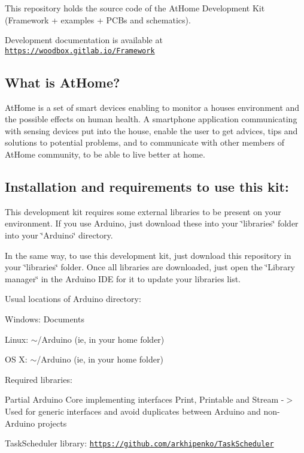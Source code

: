 This repository holds the source code of the At\+Home Development Kit (Framework + examples + P\+C\+Bs and schematics).

Development documentation is available at \href{https://woodbox.gitlab.io/Framework}{\tt https\+://woodbox.\+gitlab.\+io/\+Framework}

\subsection*{What is At\+Home?}

At\+Home is a set of smart devices enabling to monitor a house\textquotesingle{}s environment and the possible effects on human health. A smartphone application communicating with sensing devices put into the house, enable the user to get advices, tips and solutions to potential problems, and to communicate with other members of At\+Home community, to be able to live better at home.

\subsection*{Installation and requirements to use this kit\+:}

This development kit requires some external libraries to be present on your environment. If you use Arduino, just download these into your \char`\"{}libraries\char`\"{} folder into your \char`\"{}\+Arduino\char`\"{} directory.

In the same way, to use this development kit, just download this repository in your \char`\"{}libraries\char`\"{} folder. Once all libraries are downloaded, just open the \char`\"{}\+Library manager\char`\"{} in the Arduino I\+DE for it to update your libraries list.

Usual locations of Arduino directory\+:
\begin{DoxyItemize}
\item Windows\+: Documents
\item Linux\+: $\sim$/\+Arduino (ie, in your home folder)
\item OS X\+: $\sim$/\+Arduino (ie, in your home folder)
\end{DoxyItemize}

Required libraries\+:
\begin{DoxyItemize}
\item Partial Arduino Core implementing interfaces Print, Printable and Stream -\/$>$ Used for generic interfaces and avoid duplicates between Arduino and non-\/\+Arduino projects
\item Task\+Scheduler library\+: \href{https://github.com/arkhipenko/TaskScheduler}{\tt https\+://github.\+com/arkhipenko/\+Task\+Scheduler}
\end{DoxyItemize}

